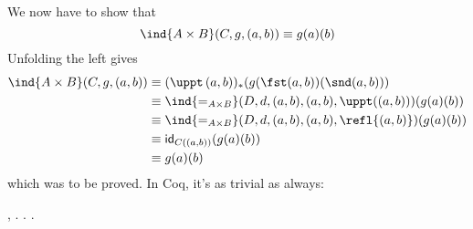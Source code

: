 We now have to show that
\[
\ind{A \times B}(C, g, (a, b)) 
\equiv g(a)(b)
\]
Unfolding the left gives
\begin{align*}
\ind{A \times B}(C, g, (a, b)) 
&\equiv
(\uppt\, (a, b))_{*}(g(\fst (a, b))(\snd (a, b)))
\\&\equiv
\ind{=_{A \times B}}(D, d, (a, b), (a, b), \uppt((a, b)))(g(a)(b))
\\&\equiv
\ind{=_{A \times B}}(D, d, (a, b), (a, b), \refl{(a, b)})
(g(a)(b))
\\&\equiv
\mathsf{id}_{C((a, b))}(g(a)(b))
\\&\equiv
g(a)(b)
\end{align*}
which was to be proved.  In Coq, it's as trivial as always: \begin{coqdoccode}
\coqdocemptyline
\coqdocnoindent
{} \coqdockw{\ensuremath{\forall}}    ,      \coqdocnotation{=}   . . .\coqdoceol
\coqdocemptyline
\coqdocemptyline
\end{coqdoccode}


